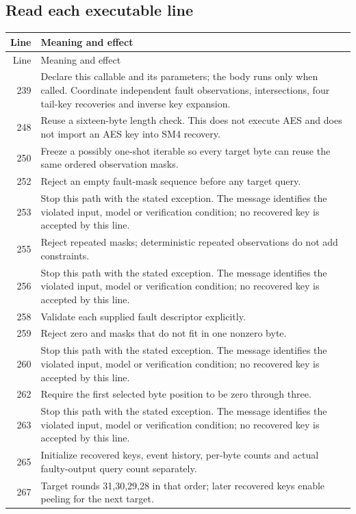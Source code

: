 \subsection*{Read each executable line}
\begingroup\small\begin{longtable}{r >{\raggedright\arraybackslash}p{138mm}}\toprule Line&Meaning and effect\\\midrule\endfirsthead\toprule Line&Meaning and effect\\\midrule\endhead
239&Declare this callable and its parameters; the body runs only when called. Coordinate independent fault observations, intersections, four tail-key recoveries and inverse key expansion.\\
248&Reuse a sixteen-byte length check. This does not execute AES and does not import an AES key into SM4 recovery.\\
250&Freeze a possibly one-shot iterable so every target byte can reuse the same ordered observation masks.\\
252&Reject an empty fault-mask sequence before any target query.\\
253&Stop this path with the stated exception. The message identifies the violated input, model or verification condition; no recovered key is accepted by this line.\\
255&Reject repeated masks; deterministic repeated observations do not add constraints.\\
256&Stop this path with the stated exception. The message identifies the violated input, model or verification condition; no recovered key is accepted by this line.\\
258&Validate each supplied fault descriptor explicitly.\\
259&Reject zero and masks that do not fit in one nonzero byte.\\
260&Stop this path with the stated exception. The message identifies the violated input, model or verification condition; no recovered key is accepted by this line.\\
262&Require the first selected byte position to be zero through three.\\
263&Stop this path with the stated exception. The message identifies the violated input, model or verification condition; no recovered key is accepted by this line.\\
265&Initialize recovered keys, event history, per-byte counts and actual faulty-output query count separately.\\
267&Target rounds 31,30,29,28 in that order; later recovered keys enable peeling for the next target.\\

\end{longtable}
